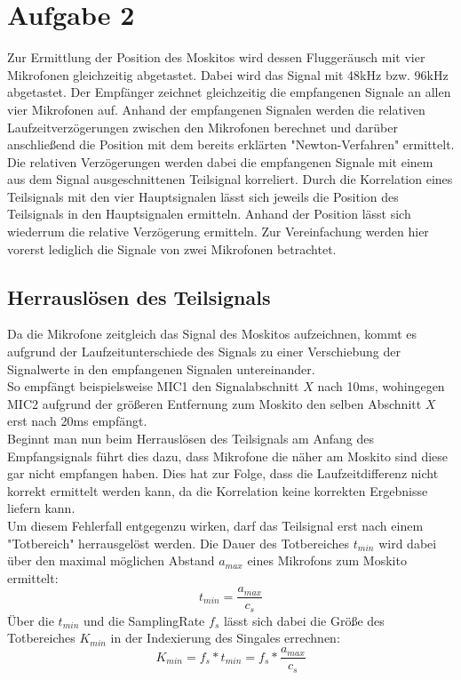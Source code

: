 \newpage
\section{Aufgabe 2}
Zur Ermittlung der Position des Moskitos wird dessen Fluggeräusch mit vier Mikrofonen gleichzeitig abgetastet.
Dabei wird das Signal mit 48kHz bzw. 96kHz abgetastet. 
Der Empfänger zeichnet gleichzeitig die empfangenen Signale an allen vier Mikrofonen auf. 
Anhand der empfangenen Signalen werden die relativen Laufzeitverzögerungen zwischen den Mikrofonen berechnet und darüber anschließend die Position mit dem bereits erklärten "Newton-Verfahren" ermittelt.
Die relativen Verzögerungen werden dabei die empfangenen Signale mit einem aus dem Signal ausgeschnittenen Teilsignal korreliert. Durch die Korrelation eines Teilsignals mit den vier Hauptsignalen lässt sich jeweils die Position des Teilsignals in den Hauptsignalen ermitteln. Anhand der Position lässt sich wiederrum die relative Verzögerung ermitteln. Zur Vereinfachung werden hier vorerst lediglich die Signale von zwei Mikrofonen betrachtet.
\subsection{Herrauslösen des Teilsignals}
Da die Mikrofone zeitgleich das Signal des Moskitos aufzeichnen, kommt es aufgrund der Laufzeitunterschiede des Signals zu einer Verschiebung der Signalwerte in den empfangenen Signalen untereinander. \\
So empfängt beispielsweise MIC1 den Signalabschnitt $X$ nach 10ms, wohingegen MIC2 aufgrund der größeren Entfernung zum Moskito den selben Abschnitt $X$ erst nach 20ms empfängt.\\
Beginnt man nun beim Herrauslösen des Teilsignals am Anfang des Empfangsignals führt dies dazu, dass Mikrofone die näher am Moskito sind diese gar nicht empfangen haben. Dies hat zur Folge, dass die Laufzeitdifferenz nicht korrekt ermittelt werden kann, da die Korrelation keine korrekten Ergebnisse liefern kann.\\
Um diesem Fehlerfall entgegenzu wirken, darf das Teilsignal erst nach einem "Totbereich" herrausgelöst werden. Die Dauer des Totbereiches $t_{min}$ wird dabei über den maximal möglichen Abstand $a_{max}$ eines Mikrofons zum Moskito ermittelt:
$$	t_{min} = \frac{a_{max}}{c_{s}} $$
Über die $t_{min}$ und die SamplingRate $f_s$ lässt sich dabei die Größe des Totbereiches $K_{min}$ in der Indexierung des Singales errechnen:
\begin{equation}
	K_{min} = f_s * t_{min}   = f_s * \frac{a_{max}}{c_{s}} \label{eq:A2A2E1}
\end{equation}

